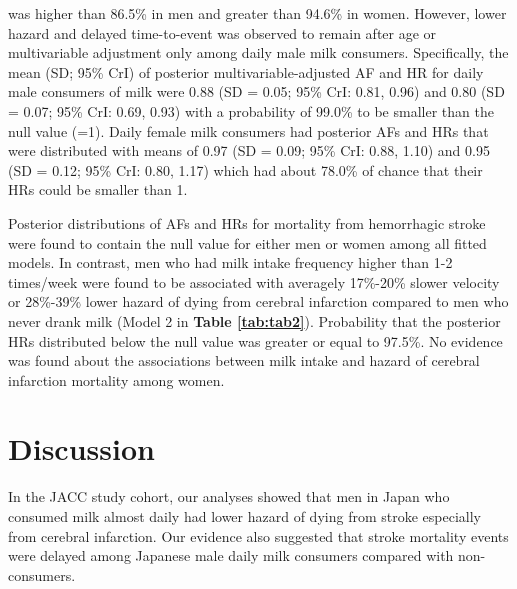 \documentclass[nutrients,article,submitted,moreauthors,pdftex]{Definitions/mdpi}
\begin{document}
\noindent was higher than 86.5\% in men and greater than 94.6\% in
women. However, lower hazard and delayed time-to-event was observed to
remain after age or multivariable adjustment only among daily male milk
consumers. Specifically, the mean (SD; 95\% CrI) of posterior
multivariable-adjusted AF and HR for daily male consumers of milk were
0.88 (SD = 0.05; 95\% CrI: 0.81, 0.96) and 0.80 (SD = 0.07; 95\% CrI:
0.69, 0.93) with a probability of 99.0\% to be smaller than the null
value (=1). Daily female milk consumers had posterior AFs and HRs that
were distributed with means of 0.97 (SD = 0.09; 95\% CrI: 0.88, 1.10)
and 0.95 (SD = 0.12; 95\% CrI: 0.80, 1.17) which had about 78.0\% of
chance that their HRs could be smaller than 1.

Posterior distributions of AFs and HRs for mortality from hemorrhagic
stroke were found to contain the null value for either men or women
among all fitted models. In contrast, men who had milk intake frequency
higher than 1-2 times/week were found to be associated with averagely
17\%-20\% slower velocity or 28\%-39\% lower hazard of dying from
cerebral infarction compared to men who never drank milk (Model 2 in
\textbf{Table \ref{tab:tab2}}). Probability that the posterior HRs
distributed below the null value was greater or equal to 97.5\%. No
evidence was found about the associations between milk intake and hazard
of cerebral infarction mortality among women.

\hypertarget{discussion}{%
\section{Discussion}\label{discussion}}

In the JACC study cohort, our analyses showed that men in Japan who
consumed milk almost daily had lower hazard of dying from stroke
especially from cerebral infarction. Our evidence also suggested that
stroke mortality events were delayed among Japanese male daily milk
consumers compared with non-consumers.
\end{document}
